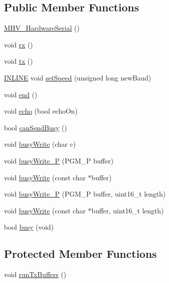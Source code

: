 \subsection*{Public Member Functions}
\begin{DoxyCompactItemize}
\item 
\hyperlink{class_m_h_v___hardware_serial_ac392ea5f8fc837b42a5cb715b82d8a5a}{M\-H\-V\-\_\-\-Hardware\-Serial} ()
\item 
void \hyperlink{class_m_h_v___hardware_serial_a4845eb822e5dd7fa79cff2e7abab5b09}{rx} ()
\item 
void \hyperlink{class_m_h_v___hardware_serial_aba7618ffea93fe55c89ee2e80dd58420}{tx} ()
\item 
\hyperlink{_m_h_v__io_8h_a2eb6f9e0395b47b8d5e3eeae4fe0c116}{I\-N\-L\-I\-N\-E} void \hyperlink{class_m_h_v___hardware_serial_afb81e35994207bbc69dbe358cfdc2d1d}{set\-Speed} (unsigned long new\-Baud)
\item 
void \hyperlink{class_m_h_v___hardware_serial_a81aa6c2fefa84828981532957715a5bc}{end} ()
\item 
void \hyperlink{class_m_h_v___hardware_serial_ab92dd294b30de5f6a5bbce966f785101}{echo} (bool echo\-On)
\item 
bool \hyperlink{class_m_h_v___hardware_serial_a9a7d51c9b6da38719fbe2b9189ef8e77}{can\-Send\-Busy} ()
\item 
void \hyperlink{class_m_h_v___hardware_serial_a10ac0f7ec6919369ea7eb9a5360078f4}{busy\-Write} (char c)
\item 
void \hyperlink{class_m_h_v___hardware_serial_ab72fb3d58cf14e58779b7ff043c133a0}{busy\-Write\-\_\-\-P} (P\-G\-M\-\_\-\-P buffer)
\item 
void \hyperlink{class_m_h_v___hardware_serial_a3b8b455b53034b823ef344cbdc0e029c}{busy\-Write} (const char $\ast$buffer)
\item 
void \hyperlink{class_m_h_v___hardware_serial_aa9b4eec30496cbf57ee73a02b170ed75}{busy\-Write\-\_\-\-P} (P\-G\-M\-\_\-\-P buffer, uint16\-\_\-t length)
\item 
void \hyperlink{class_m_h_v___hardware_serial_a0b9a77b4025b675f3c90f70bb1150040}{busy\-Write} (const char $\ast$buffer, uint16\-\_\-t length)
\item 
bool \hyperlink{class_m_h_v___hardware_serial_ae26b2318f6baf5e229b913885bfb7763}{busy} (void)
\end{DoxyCompactItemize}
\subsection*{Protected Member Functions}
\begin{DoxyCompactItemize}
\item 
void \hyperlink{class_m_h_v___hardware_serial_a7150bb4ec7b8362af5a04973f1b8e478}{run\-Tx\-Buffers} ()
\end{DoxyCompactItemize}
